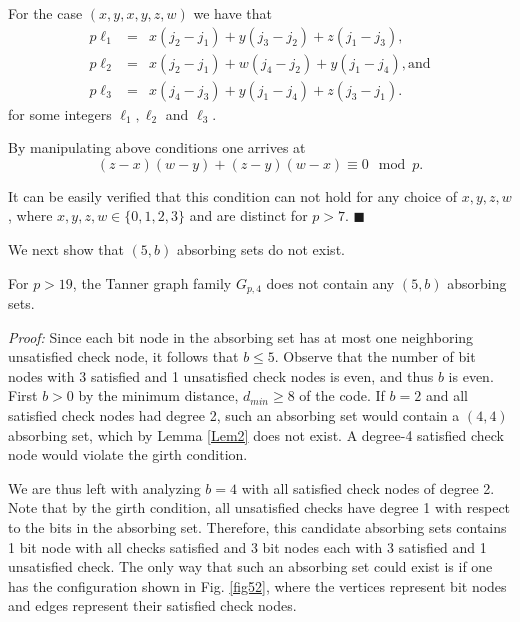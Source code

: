 For the case $(x,y,x,y,z,w)$ we have that
\begin{eqnarray*}
p\ell_1&=&x(j_2-j_1)+y(j_3-j_2)+z(j_1-j_3),\\
p\ell_2&=&x(j_2-j_1)+w(j_4-j_2)+y(j_1-j_4), \text{and}\\
p\ell_3&=&x(j_4-j_3)+y(j_1-j_4)+z(j_3-j_1).
\end{eqnarray*}
for some integers $\ell_1,\ell_2$ and $\ell_3$.

By manipulating above conditions one arrives at
\begin{equation}\label{eq23}
(z-x)(w-y)+(z-y)(w-x) \equiv 0 \mod p.
\end{equation}

It can be easily verified that this condition can not hold for any
choice of $x,y,z,w$, where $x,y,z,w \in \{0,1,2,3 \}$ and are
distinct for $p>7$. \hfill$\blacksquare$

We next show that $(5,b)$ absorbing sets do not exist.
\begin{lemma}\label{Lem3} For $p>19$, the Tanner graph family $G_{p,4}$
does not contain any $(5,b)$ absorbing sets.
 \end{lemma}

\noindent \textit{Proof:} Since each bit node in the absorbing set
has at most one neighboring unsatisfied check node, it follows
that $b \leq 5$. Observe that the number of bit nodes with 3
satisfied and 1 unsatisfied check nodes is even, and thus $b$ is
even. First $b>0$ by the minimum distance, $d_{min}\geq 8$
\cite{helles} of the code. If $b=2$ and all satisfied check nodes
had degree 2, such an absorbing set would contain a $(4,4)$
absorbing set, which by Lemma \ref{Lem2} does not exist. A
degree-4 satisfied check node would violate the girth condition.


We are thus left with analyzing $b=4$ with all satisfied check
nodes of degree 2. Note that by the girth condition, all
unsatisfied checks have degree 1 with respect to the bits in the
absorbing set. Therefore, this candidate absorbing sets contains 1
bit node with all checks satisfied and 3 bit nodes each with 3
satisfied and 1 unsatisfied check. The only way that such an
absorbing set could exist is if one has the configuration shown in
Fig. \ref{fig52}, where the vertices represent bit nodes and edges
represent their satisfied check nodes.

